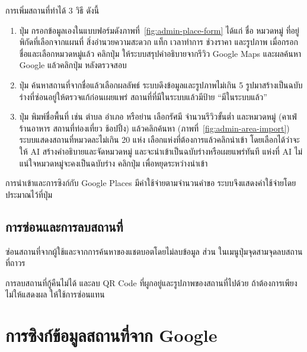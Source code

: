 การเพิ่มสถานที่ทำได้ 3 วิธี ดังนี้

\begin{enumerate}
\item ปุ่ม  กรอกข้อมูลเองในแบบฟอร์มดังภาพที่~\ref{fig:admin-place-form} ได้แก่ ชื่อ หมวดหมู่ ที่อยู่ พิกัดที่เลือกจากแผนที่ สิ่งอำนวยความสะดวก แท็ก เวลาทำการ ช่วงราคา และรูปภาพ เมื่อกรอกชื่อและเลือกหมวดหมู่แล้ว คลิกปุ่ม  ให้ระบบสรุปคำอธิบายจากรีวิว Google Maps และผลค้นหา Google แล้วคลิกปุ่ม  หลังตรวจสอบ
\item ปุ่ม  ค้นหาสถานที่จากชื่อแล้วเลือกผลลัพธ์ ระบบดึงข้อมูลและรูปภาพไม่เกิน 5 รูปมาสร้างเป็นฉบับร่างที่ซ่อนอยู่ให้ตรวจแก้ก่อนเผยแพร่ สถานที่ที่มีในระบบแล้วมีป้าย ``มีในระบบแล้ว''
\item ปุ่ม  พิมพ์ชื่อพื้นที่ เช่น ตำบล อำเภอ หรือย่าน เลือกรัศมี จำนวนรีวิวขั้นต่ำ และหมวดหมู่ (คาเฟ่ ร้านอาหาร สถานที่ท่องเที่ยว ช้อปปิ้ง) แล้วคลิกค้นหา (ภาพที่~\ref{fig:admin-area-import}) ระบบแสดงสถานที่หมวดละไม่เกิน 20 แห่ง เลือกแห่งที่ต้องการแล้วคลิกนำเข้า โดยเลือกได้ว่าจะให้ AI สร้างคำอธิบายและจัดหมวดหมู่ และจะนำเข้าเป็นฉบับร่างหรือเผยแพร่ทันที แห่งที่ AI ไม่แน่ใจหมวดหมู่จะคงเป็นฉบับร่าง คลิกปุ่ม  เพื่อหยุดระหว่างนำเข้า
\end{enumerate}



\begin{note}
การนำเข้าและการซิงก์กับ Google Places มีค่าใช้จ่ายตามจำนวนคำขอ ระบบจึงแสดงค่าใช้จ่ายโดยประมาณไว้ที่ปุ่ม
\end{note}

\subsection{การซ่อนและการลบสถานที่}

 ซ่อนสถานที่จากผู้ใช้และจากการค้นหาของแชตบอตโดยไม่ลบข้อมูล ส่วน  ในเมนูปุ่มจุดสามจุดลบสถานที่ถาวร

\begin{warning}
การลบสถานที่กู้คืนไม่ได้ และลบ QR Code ที่ผูกอยู่และรูปภาพของสถานที่ไปด้วย ถ้าต้องการเพียงไม่ให้แสดงผล ให้ใช้การซ่อนแทน
\end{warning}

\section{การซิงก์ข้อมูลสถานที่จาก Google}
\label{sec:place-sync}

